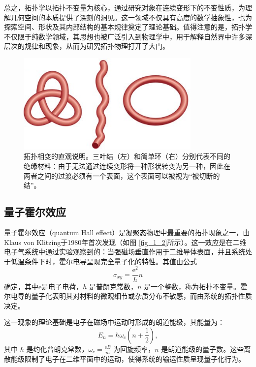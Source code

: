 总之，拓扑学以拓扑不变量为核心，通过研究对象在连续变形下的不变性质，为理解几何空间的本质提供了深刻的洞见。这一领域不仅具有高度的数学抽象性，也为探索空间、形状及其内部结构的基本规律奠定了理论基础。值得注意的是，拓扑学不仅限于纯数学领域，其思想也被广泛引入到物理学中，用于解释自然界中许多深层次的规律和现象，从而为研究拓扑物理打开了大门。
\begin{figure}[h!]
    \centering
    \includegraphics[width=0.8\textwidth]{images/fig1-1.png} 
    \caption{拓扑相变的直观说明。三叶结（左）和简单环（右）分别代表不同的绝缘材料：由于无法通过连续变形将一种形状转变为另一种，因此在两者之间的过渡必须有一个表面，这个表面可以被视为“被切断的结”\cite{d1}。}
    \label{fig_1_1}
\end{figure}


\subsection{量子霍尔效应}
量子霍尔效应（quantum Hall effect）是凝聚态物理中最重要的拓扑现象之一，由Klaus von Klitzing于1980年首次发现\cite{d2}（如图 \ref{fig_1_2}所示）。这一效应是在二维电子气系统中通过实验观察到的：当强磁场垂直作用于二维导体表面，并且系统处于低温条件下时，霍尔电导呈现完全量子化的特性。其值由公式
\begin{equation} \label{eq1-1}
    \sigma_{xy} = \frac{\mathrm{e}^2}{h} n
\end{equation}
确定，其中e是电子电荷，\( h \) 是普朗克常数，\( n \) 是一个整数，称为拓扑不变量。霍尔电导的量子化表明其对材料的微观细节或杂质分布不敏感，而由系统的拓扑性质决定。

这一现象的理论基础是电子在磁场中运动时形成的朗道能级，其能量为：
\begin{equation} \label{eq1-2}
    E_n = \hbar \omega_c \left( n + \frac{1}{2} \right),
\end{equation}
其中 \( \hbar \) 是约化普朗克常数，\( \omega_c = \frac{\mathrm{e}B}{m} \) 为回旋频率，\( n \) 是朗道能级的量子数。这些离散能级限制了电子在二维平面中的运动，使得系统的输运性质呈现量子化行为。

